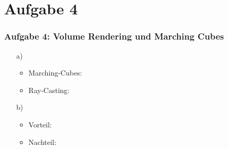 \documentclass[accentcolor=tud9c,colorbacktitle,inverttitle,landscape,german,presentation,t]{tudbeamer}
\begin{document}
\section{Aufgabe 4}
\begin{frame}
	\frametitle{Aufgabe 4: Volume Rendering und Marching Cubes}
	\begin{itemize}
	\item[a)] %
		\begin{itemize}
			\item Marching-Cubes: \\
			\item Ray-Casting: 
		\end{itemize}
	\item[b)] %
	\begin{itemize}
		\item Vorteil: \\
		\item Nachteil: 
	\end{itemize}
	\end{itemize}
\end{frame}
\end{document}

